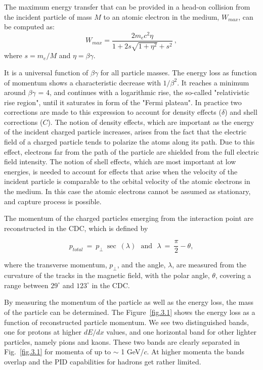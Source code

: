 The maximum energy transfer that can be provided in a head-on collision from the incident particle of mass $M$ to an atomic electron in the medium, $W_{max}$, can be computed as:
\begin{equation}
    \label{eq.3.2}
    W_{max} = \frac{2 m_e c^2 \eta}{1 + 2 s \sqrt{1 + \eta^2} + s^2}~,
\end{equation}
where $s = m_e/M$ and $\eta = \beta \gamma$.
~\par It is a universal function of $\beta \gamma$ for all particle masses. The energy loss as function of momentum shows a characteristic decrease with $1/\beta^{2}$. It reaches a minimum around $\beta \gamma$ = 4, and continues with a logarithmic rise, the so-called "relativistic rise region", until it saturates in form of the "Fermi plateau". In practice two corrections are made to this expression to account for density effects ($\delta$) and shell corrections ($C$). The notion of density effects, which are important as the energy of the incident charged particle increases, arises from the fact that the electric field of a charged particle tends to polarize the atoms along its path. Due to this effect, electrons far from the path of the particle are shielded from the full electric field intensity. The notion of shell effects, which are most important at low energies, is needed to account for effects that arise when the velocity of the incident particle is comparable to the orbital velocity of the atomic electrons in the medium. In this case the atomic electrons cannot be assumed as stationary, and capture process is possible.
~\par The momentum of the charged particles emerging from the interaction point are reconstructed in the CDC, which is defined by

\begin{equation}
    \label{eq.3.2.1}
    p_{total}~=~p_{\perp}~\sec~(\lambda)~~~\mathrm{and}~~~\lambda~=~\frac{\pi}{2}-\theta,
\end{equation}

\noindent where the transverse momentum, $p_{\perp}$, and the angle, $\lambda$, are measured from the curvature of the tracks in the magnetic field, with the polar angle, $\theta$, covering a range between $29^{\circ}$ and $123^{\circ}$ in the CDC.
~\par By measuring the momentum of the particle as well as the energy loss, the mass of the particle can be determined. The Figure~\ref{fig.3.1} shows the energy loss as a function of reconstructed particle momentum. We see two distinguished bands, one for protons at higher $dE/dx$ values, and one horizontal band for other lighter particles, namely pions and kaons. These two bands are clearly separated in Fig.~\ref{fig.3.1} for momenta of up to $\sim$ 1 GeV/$c$. At higher momenta the bands overlap and the PID capabilities for hadrons get rather limited.

